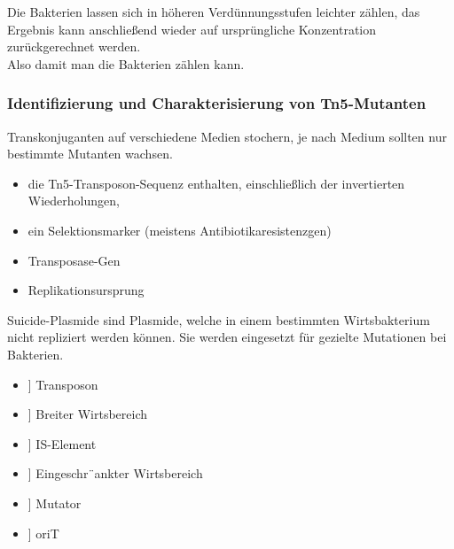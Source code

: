 \begin{mybox}[title=Warum macht man Verdünnungsreihen?]
Die Bakterien lassen sich in höheren Verdünnungsstufen leichter zählen, das Ergebnis kann anschließend wieder auf ursprüngliche Konzentration zurückgerechnet werden. \\
Also damit man die Bakterien zählen kann. 
\end{mybox}

\subsubsection{Identifizierung und Charakterisierung von Tn5-Mutanten} 
Transkonjuganten auf verschiedene Medien stochern, je nach Medium sollten nur bestimmte Mutanten wachsen.



\begin{mechanism}[title=Welche Eigenschaften muss ein Vektor für tn5 Mutagenese auf jeden Fall aufweisen?]
\begin{itemize}
    \item  die Tn5-Transposon-Sequenz enthalten, einschließlich der invertierten Wiederholungen,
    \item ein Selektionsmarker (meistens Antibiotikaresistenzgen)
    \item Transposase-Gen
    \item Replikationsursprung
\end{itemize}
\end{mechanism}



\begin{mechanism}[title=Was ist ein SuicidePlasmid und wofür wird es verwendet?]
Suicide-Plasmide sind Plasmide, welche in einem bestimmten Wirtsbakterium nicht repliziert werden können.
Sie werden eingesetzt für gezielte Mutationen bei Bakterien.   
\end{mechanism}

\begin{mechanism}[title=Welche der folgenden Eigenschaften hat ein suicide-Vektor]
\todo 
\begin{itemize}
    \item[[ ]] Transposon
    \item[[ ]] Breiter Wirtsbereich
    \item[[ ]] IS-Element
    \item[[ ]] Eingeschr¨ankter Wirtsbereich
    \item[[ ]] Mutator
    \item[[ ]] oriT
\end{itemize}
\end{mechanism}

